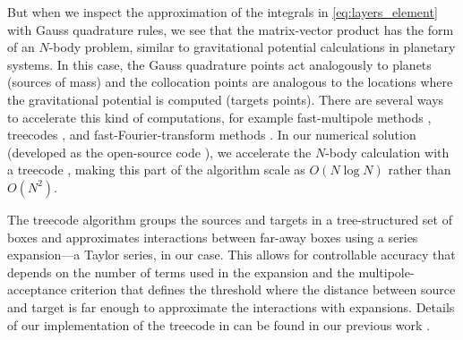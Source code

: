 But when we inspect the approximation of the integrals in  \eqref{eq:layers_element} with Gauss quadrature rules, we see that the matrix-vector product has the form of an $N$-body problem, similar to gravitational potential calculations in planetary systems. In this case, the Gauss quadrature points act analogously to planets (sources of mass) and the collocation points are analogous to the locations where the gravitational potential is computed (targets points). There are several ways to accelerate this kind of computations, for example fast-multipole methods \cite{GreengardRokhlin1987}, treecodes \cite{BarnesHut1986}, and fast-Fourier-transform methods \cite{PhillipsWhite1997}.
In our numerical solution (developed as the open-source code \pygbe), we accelerate the $N$-body calculation with a treecode \cite{BarnesHut1986,LiJohnstonKrasny2009}, making this part of the algorithm scale as $O(N\log N)$ rather than $O(N^2)$. 

The treecode algorithm groups the sources and targets in a tree-structured set of boxes and approximates interactions between far-away boxes using a series expansion---a Taylor series, in our case. This allows for controllable accuracy that depends on the number of terms used in the expansion and the multipole-acceptance criterion that defines the threshold where the distance between source and target is far enough to approximate the interactions with expansions. Details of our implementation of the treecode in \pygbe can be found in our previous work \cite{CooperBarba-share154331}.

